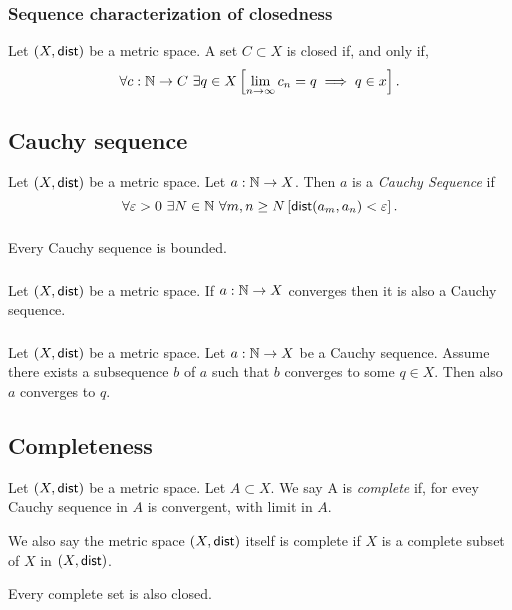 \subsubsection*{Sequence characterization of closedness}
\uprop Let $(X, \mathsf{dist})$ be a metric space. A set $C \subset X$ is closed if,
and only if,
\[
    \forall c : \mathbb{N} \to C\ \exists q \in X \left[ \lim_{n \to \infty} c_n = q \implies q \in x \right].
\]

\subsection{Cauchy sequence}
\udef Let $(X, \mathsf{dist})$ be a metric space. Let $a : \mathbb{N} \to X$. Then $a$ is a
\emph{Cauchy Sequence} if
\[
    \forall \varepsilon > 0\ \exists N \in \mathbb{N}\ \forall m,n \geq N \left[ \mathsf{dist}(a_m, a_n) < \varepsilon \right].
\]

\subsubsection*{}
\uprop Every Cauchy sequence is bounded.

\subsubsection*{}
\uprop Let $(X, \mathsf{dist})$ be a metric space. If $a : \mathbb{N} \to X$ converges then
it is also a Cauchy sequence.

\subsubsection*{}
\uprop Let $(X, \mathsf{dist})$ be a metric space.
Let $a : \mathbb{N} \to X$ be a Cauchy sequence. Assume there exists a subsequence $b$
of $a$ such that $b$ converges to some $q \in X$. Then also $a$ converges to $q$.

\subsection{Completeness}
\udef Let $(X, \mathsf{dist})$ be a metric space. Let $A \subset X$. We say A is
\emph{complete} if, for evey Cauchy sequence in $A$ is convergent,
with limit in $A$.

\par
We also say the metric space $(X, \mathsf{dist})$ itself is complete if $X$ is a complete
subset of $X$ in $(X, \mathsf{dist})$.

\par
Every complete set is also closed.

